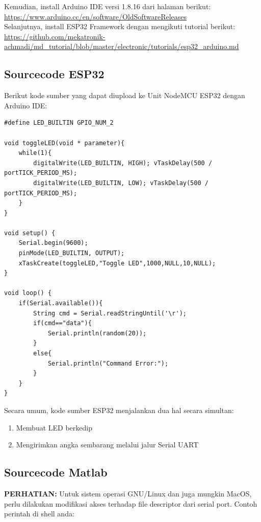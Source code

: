 \documentclass[12pt]{book}
\begin{document}
	Kemudian, install Arduino IDE versi 1.8.16 dari halaman berikut:\\
	\url{https://www.arduino.cc/en/software/OldSoftwareReleases}\\

	Selanjutnya, install ESP32 Framework dengan mengikuti tutorial berikut:\\
	\url{https://github.com/mekatronik-achmadi/md_tutorial/blob/master/electronic/tutorials/esp32_arduino.md}

	\subsection{Sourcecode ESP32}

	Berikut kode sumber yang dapat diupload ke Unit NodeMCU ESP32 dengan Arduino IDE:

	\begin{verbatim}
#define LED_BUILTIN GPIO_NUM_2

void toggleLED(void * parameter){
	while(1){
		digitalWrite(LED_BUILTIN, HIGH); vTaskDelay(500 / portTICK_PERIOD_MS);
		digitalWrite(LED_BUILTIN, LOW); vTaskDelay(500 / portTICK_PERIOD_MS);
	}
}

void setup() {
	Serial.begin(9600);
	pinMode(LED_BUILTIN, OUTPUT);
	xTaskCreate(toggleLED,"Toggle LED",1000,NULL,10,NULL);
}

void loop() {
	if(Serial.available()){
		String cmd = Serial.readStringUntil('\r');
		if(cmd=="data"){
			Serial.println(random(20));
		}
		else{
			Serial.println("Command Error:");
		}
	}
}
	\end{verbatim}

	Secara umum, kode sumber ESP32 menjalankan dua hal secara simultan:
	\begin{enumerate}
		\item Membuat LED berkedip
		\item Mengirimkan angka sembarang melalui jalur Serial UART
	\end{enumerate}

	\subsection{Sourcecode Matlab}

	\textbf{PERHATIAN:} Untuk sistem operasi GNU/Linux dan juga mungkin MacOS,
	perlu dilakukan modifikasi akses terhadap file descriptor dari serial port.
	Contoh perintah di shell anda:
\end{document}
